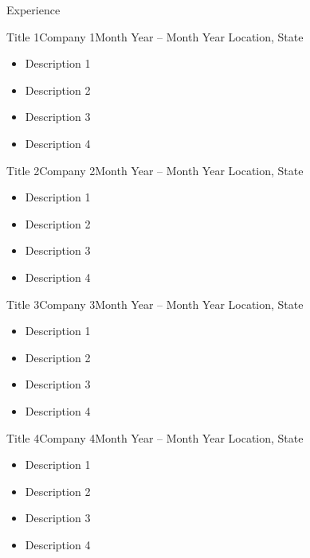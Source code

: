 \documentclass[]{../mcdowellcv}
\begin{document}
\makeheader

\begin{cvsection}{Experience}

    \begin{cvsubsection}{Title 1}{Company 1}{Month Year -- Month Year}
        Location, State
        \vspace{2.5mm}
        \begin{itemize}
            \item Description 1
            \item Description 2
            \item Description 3
            \item Description 4
        \end{itemize}
    \end{cvsubsection}
    
    \begin{cvsubsection}{Title 2}{Company 2}{Month Year -- Month Year}
        Location, State
        \vspace{2.5mm}
        \begin{itemize}
            \item Description 1
            \item Description 2
            \item Description 3
            \item Description 4
        \end{itemize}
    \end{cvsubsection}
    
    \begin{cvsubsection}{Title 3}{Company 3}{Month Year -- Month Year}
        Location, State
        \vspace{2.5mm}
        \begin{itemize}
            \item Description 1
            \item Description 2
            \item Description 3
            \item Description 4
        \end{itemize}
    \end{cvsubsection}
    
    \begin{cvsubsection}{Title 4}{Company 4}{Month Year -- Month Year}
        Location, State
        \vspace{2.5mm}
        \begin{itemize}
            \item Description 1
            \item Description 2
            \item Description 3
            \item Description 4
        \end{itemize}
    \end{cvsubsection}
    
\end{cvsection}
\end{document}
